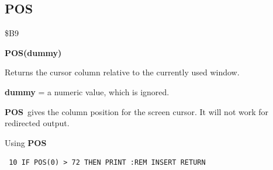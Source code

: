 \subsection{POS}
\begin{description}[leftmargin=2cm,style=nextline]
\item [Token:] \$B9
\item [Format:] {\bf POS(dummy)}
\item [Usage:]  Returns the cursor column relative to the
                currently used window.

                {\bf dummy} = a numeric value, which is ignored.

\item [Remarks:] {\bf POS} gives the column position for the screen
                 cursor. It will not work for redirected output.

\item [Example:] Using {\bf POS}

\begin{tcolorbox}[colback=black,coltext=white]
\verbatimfont{\codefont}
\begin{verbatim}
 10 IF POS(0) > 72 THEN PRINT :REM INSERT RETURN
\end{verbatim}
\end{tcolorbox}
\end{description}


\newpage
